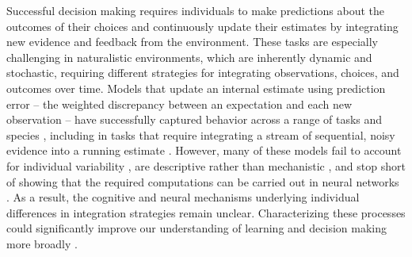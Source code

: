 \documentclass[12pt]{article}
\begin{document}
Successful decision making requires individuals to make predictions about the outcomes of their choices and continuously update their estimates by integrating new evidence and feedback from the environment. These tasks are especially challenging in naturalistic environments, which are inherently dynamic and stochastic, requiring different strategies for integrating observations, choices, and outcomes over time. Models that update an internal estimate using prediction error -- the weighted discrepancy between an expectation and each new observation -- have successfully captured behavior across a range of tasks and species \cite{sutton2018reinforcement, palminteri2022computational, palminteri2017confirmation, camerer1999experience, godara2025apparent}, including in tasks that require integrating a stream of sequential, noisy evidence into a running estimate \cite{behrens2007learning, nassar2010approximately, yu2008sequential, prat2024imprecise}. However, many of these models fail to account for individual variability \cite{cain2012computational, gibson1997learning, waskom2018decision, kopec2024integrate}, are descriptive rather than mechanistic \cite{sackett2017individual, ackerman1987individual}, and stop short of showing that the required computations can be carried out in neural networks \cite{averbeck2022reinforcement, oconnell2018bridging}. As a result, the cognitive and neural mechanisms underlying individual differences in integration strategies remain unclear. Characterizing these processes could significantly improve our understanding of learning and decision making more broadly \cite{goodhew2019translating, boogert2018measuring}.
\end{document}
